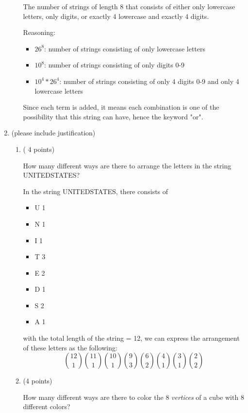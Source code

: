 \documentclass[10pt,letterpaper,unboxed,cm]{article}
\begin{document}
\begin{enumerate}
\begin{enumerate}
The number of strings of length 8 that consists of either only lowercase letters, only digits, or exactly 4 lowercase and exactly 4 digits.

Reasoning: 
\begin{itemize}
    \item $26^8$: number of strings consisting of only lowercase letters
    \item $10^8$: number of strings consisting of only digits 0-9
    \item $10^4 * 26^4$: number of strings consisting of only 4 digits 0-9 and only 4 lowercase letters
\end{itemize}
Since each term is added, it means each combination is one of the possibility that this string can have, hence the keyword "or".
\end{enumerate}

\item
(please include justification)
\begin{enumerate}
\item
( 4 points)

How many different ways are there to arrange the letters in the string UNITEDSTATES?

In the string UNITEDSTATES, there consists of
\begin{itemize}
    \item U 1
    \item N 1
    \item I 1
    \item T 3
    \item E 2
    \item D 1
    \item S 2
    \item A 1
\end{itemize}
with the total length of the string = 12, we can express the arrangement of these letters as the following:
$$
    \binom{12}{1}\binom{11}{1}\binom{10}{1}\binom{9}{3}\binom{6}{2}\binom{4}{1}\binom{3}{1}\binom{2}{2}
$$

\item
(4 points)

How many different ways are there to color the 8 \emph{vertices} of a cube with 8 different colors?


\end{enumerate}
\end{enumerate}
\end{document}
